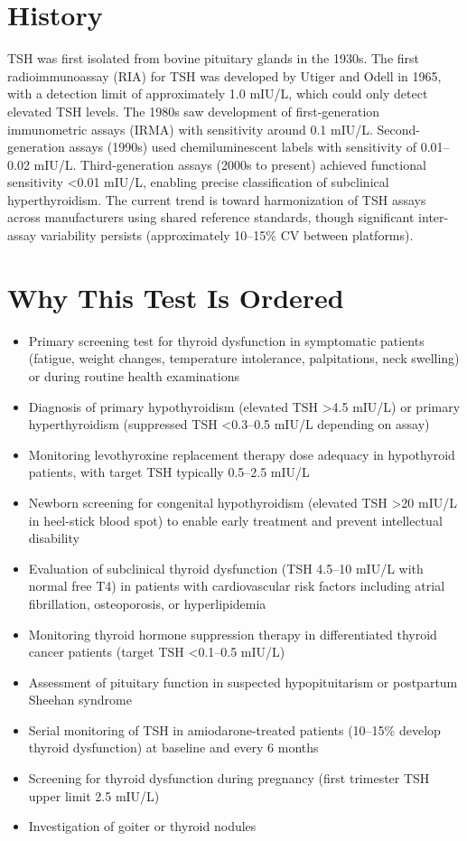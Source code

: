 \section*{History}
TSH was first isolated from bovine pituitary glands in the 1930s. The first radioimmunoassay (RIA) for TSH was developed by Utiger and Odell in 1965, with a detection limit of approximately 1.0 mIU/L, which could only detect elevated TSH levels. The 1980s saw development of first-generation immunometric assays (IRMA) with sensitivity around 0.1 mIU/L. Second-generation assays (1990s) used chemiluminescent labels with sensitivity of 0.01--0.02 mIU/L. Third-generation assays (2000s to present) achieved functional sensitivity <0.01 mIU/L, enabling precise classification of subclinical hyperthyroidism. The current trend is toward harmonization of TSH assays across manufacturers using shared reference standards, though significant inter-assay variability persists (approximately 10--15\% CV between platforms).

\section*{Why This Test Is Ordered}
\begin{itemize}
  \item Primary screening test for thyroid dysfunction in symptomatic patients (fatigue, weight changes, temperature intolerance, palpitations, neck swelling) or during routine health examinations
  \item Diagnosis of primary hypothyroidism (elevated TSH >4.5 mIU/L) or primary hyperthyroidism (suppressed TSH <0.3--0.5 mIU/L depending on assay)
  \item Monitoring levothyroxine replacement therapy dose adequacy in hypothyroid patients, with target TSH typically 0.5--2.5 mIU/L
  \item Newborn screening for congenital hypothyroidism (elevated TSH >20 mIU/L in heel-stick blood spot) to enable early treatment and prevent intellectual disability
  \item Evaluation of subclinical thyroid dysfunction (TSH 4.5--10 mIU/L with normal free T4) in patients with cardiovascular risk factors including atrial fibrillation, osteoporosis, or hyperlipidemia
  \item Monitoring thyroid hormone suppression therapy in differentiated thyroid cancer patients (target TSH <0.1--0.5 mIU/L)
  \item Assessment of pituitary function in suspected hypopituitarism or postpartum Sheehan syndrome
  \item Serial monitoring of TSH in amiodarone-treated patients (10--15\% develop thyroid dysfunction) at baseline and every 6 months
  \item Screening for thyroid dysfunction during pregnancy (first trimester TSH upper limit 2.5 mIU/L)
  \item Investigation of goiter or thyroid nodules
\end{itemize}

